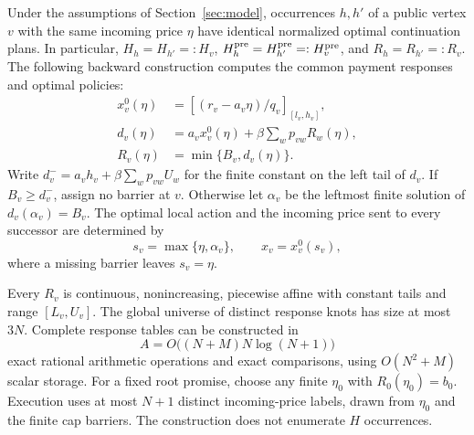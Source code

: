 \begin{theorem}\label{thm:quotient}
Under the assumptions of Section~\ref{sec:model}, occurrences $h,h'$ of a public vertex $v$ with the same incoming price $\eta$ have identical normalized optimal continuation plans. In particular, $H_h=H_{h'}=:H_v$, $H_h^{\rm pre}=H_{h'}^{\rm pre}=:H_v^{\rm pre}$, and $R_h=R_{h'}=:R_v$. The following backward construction computes the common payment responses and optimal policies:
\begin{align}
 x_v^0(\eta)&=\left[(r_v-a_v\eta)/q_v\right]_{[l_v,h_v]},\label{eq:local}\\
 d_v(\eta)&=a_vx_v^0(\eta)+\beta\sum_wp_{vw}R_w(\eta),\label{eq:pre}\\
 R_v(\eta)&=\min\{B_v,d_v(\eta)\}.\label{eq:capped}
\end{align}
Write $d_v^-=a_vh_v+\beta\sum_wp_{vw}U_w$ for the finite constant on the left tail of $d_v$. If $B_v\geq d_v^-$, assign no barrier at $v$. Otherwise let $\alpha_v$ be the leftmost finite solution of $d_v(\alpha_v)=B_v$. The optimal local action and the incoming price sent to every successor are determined by
\begin{equation}\label{eq:reflection}
 s_v=\max\{\eta,\alpha_v\},\qquad x_v=x_v^0(s_v),
\end{equation}
where a missing barrier leaves $s_v=\eta$.

Every $R_v$ is continuous, nonincreasing, piecewise affine with constant tails and range $[L_v,U_v]$. The global universe of distinct response knots has size at most $3N$. Complete response tables can be constructed in
\begin{equation}\label{eq:arithmetic}
 A=O\bigl((N+M)N\log(N+1)\bigr)
\end{equation}
exact rational arithmetic operations and exact comparisons, using $O(N^2+M)$ scalar storage. For a fixed root promise, choose any finite $\eta_0$ with $R_0(\eta_0)=b_0$. Execution uses at most $N+1$ distinct incoming-price labels, drawn from $\eta_0$ and the finite cap barriers. The construction does not enumerate $H$ occurrences.
\end{theorem}
